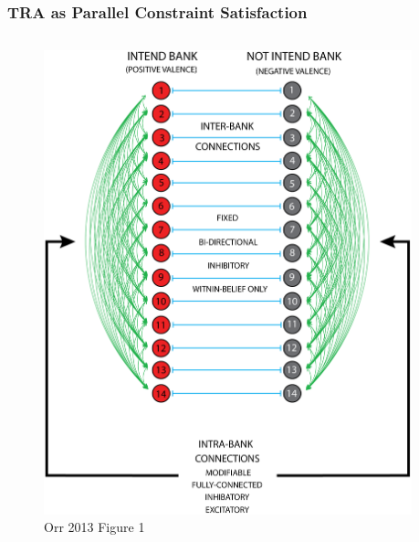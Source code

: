 \documentclass[compress]{beamer}
\begin{document}
    \begin{frame}[Basic2]\frametitle{TRA as Parallel Constraint Satisfaction}
        \begin{columns}
            \begin{column}{0.5\linewidth}

                        \vspace{7mm}

                        \begin{figure}
                            \centering
                            \includegraphics[height=0.7\textheight]{../figures/tra_nn}
                            \caption{Orr 2013 Figure 1}
                            \label{fig:trann}
                        \end{figure}
            \end{column}
            \begin{column}{0.5\linewidth}
                
                \vspace{7mm}
                

\end{column}
\end{columns}
\end{frame}
\end{document}
